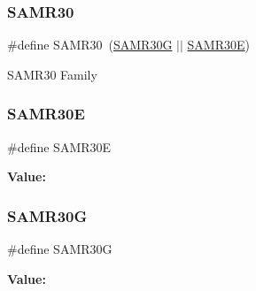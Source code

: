 \subsubsection{\texorpdfstring{SAMR30}{SAMR30}}
{\footnotesize\ttfamily \#define S\+A\+M\+R30~(\mbox{\hyperlink{group__sam__part__macros__group_ga94739d4be369821d24f77b4c9ba2ce6e}{S\+A\+M\+R30G}} $\vert$$\vert$ \mbox{\hyperlink{group__sam__part__macros__group_ga0eee38fa3fab84e5cf0f0f491a401a77}{S\+A\+M\+R30E}})}

S\+A\+M\+R30 Family \mbox{\label{group__sam__part__macros__group_ga0eee38fa3fab84e5cf0f0f491a401a77}} 
\subsubsection{\texorpdfstring{SAMR30E}{SAMR30E}}
{\footnotesize\ttfamily \#define S\+A\+M\+R30E}

{\bfseries Value\+:}
\begin{DoxyCode}{0}
\DoxyCodeLine{( \(\backslash\)}
\DoxyCodeLine{    )}

\end{DoxyCode}
\mbox{\label{group__sam__part__macros__group_ga94739d4be369821d24f77b4c9ba2ce6e}} 
\subsubsection{\texorpdfstring{SAMR30G}{SAMR30G}}
{\footnotesize\ttfamily \#define S\+A\+M\+R30G}

{\bfseries Value\+:}
\begin{DoxyCode}{0}
\DoxyCodeLine{( \(\backslash\)}
\DoxyCodeLine{    )}

\end{DoxyCode}
\mbox{\label{group__sam__part__macros__group_ga8d375463839ea94bd1bdbe23a1f87213}} 
